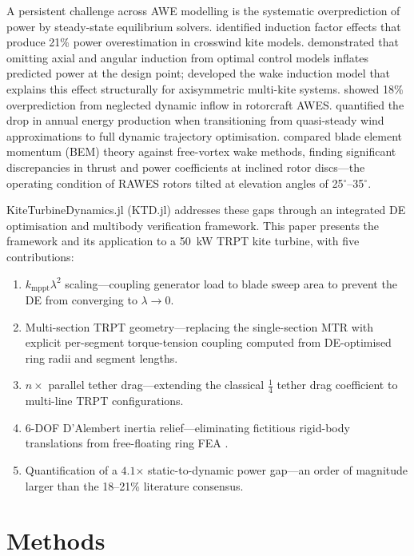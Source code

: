 \documentclass[11pt,a4paper]{article}
\begin{document}
A persistent challenge across AWE modelling is the systematic overprediction of power by steady-state equilibrium solvers. \cite{kheiri2018} identified induction factor effects that produce 21\% power overestimation in crosswind kite models. \cite{leuthold2017} demonstrated that omitting axial and angular induction from optimal control models inflates predicted power at the design point; \cite{leuthold2019} developed the wake induction model that explains this effect structurally for axisymmetric multi-kite systems. \cite{carceller2022} showed 18\% overprediction from neglected dynamic inflow in rotorcraft AWES. \cite{malz2020} quantified the drop in annual energy production when transitioning from quasi-steady wind approximations to full dynamic trajectory optimisation. \cite{pfister2020} compared blade element momentum (BEM) theory against free-vortex wake methods, finding significant discrepancies in thrust and power coefficients at inclined rotor discs—the operating condition of RAWES rotors tilted at elevation angles of 25$^\circ$--35$^\circ$.

KiteTurbineDynamics.jl (KTD.jl) addresses these gaps through an integrated DE optimisation and multibody verification framework. This paper presents the framework and its application to a 50~kW TRPT kite turbine, with five contributions:

\begin{enumerate}
\item $k_{\mathrm{mppt}} \lambda^2$ scaling—coupling generator load to blade sweep area to prevent the DE from converging to $\lambda \to 0$.
\item Multi-section TRPT geometry—replacing the single-section MTR with explicit per-segment torque-tension coupling computed from DE-optimised ring radii and segment lengths.
\item $n\times$ parallel tether drag—extending the classical $\tfrac{1}{4}$ tether drag coefficient \cite{tveide} to multi-line TRPT configurations.
\item 6-DOF D'Alembert inertia relief—eliminating fictitious rigid-body translations from free-floating ring FEA \cite{adr0001}.
\item Quantification of a $4.1$$\times$ static-to-dynamic power gap—an order of magnitude larger than the 18--21\% literature consensus.
\end{enumerate}

\section{Methods}
\end{document}
